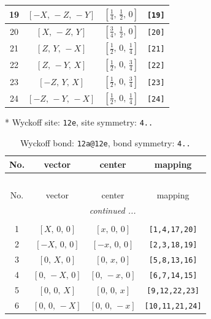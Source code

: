 \documentclass[fleqn,8pt]{jsarticle}
\begin{document}
\begin{longtable}{cccc}
19 & $\left[ - X,\, - Z,\, - Y \right]$ & $\left[ \frac{1}{4},\, \frac{1}{2},\, 0 \right]$ & {\tt [19]} \\ \hline
20 & $\left[ X,\, - Z,\, Y \right]$ & $\left[ \frac{3}{4},\, \frac{1}{2},\, 0 \right]$ & {\tt [20]} \\ \hline
21 & $\left[ Z,\, Y,\, - X \right]$ & $\left[ \frac{1}{2},\, 0,\, \frac{1}{4} \right]$ & {\tt [21]} \\ \hline
22 & $\left[ Z,\, - Y,\, X \right]$ & $\left[ \frac{1}{2},\, 0,\, \frac{3}{4} \right]$ & {\tt [22]} \\ \hline
23 & $\left[ - Z,\, Y,\, X \right]$ & $\left[ \frac{1}{2},\, 0,\, \frac{3}{4} \right]$ & {\tt [23]} \\ \hline
24 & $\left[ - Z,\, - Y,\, - X \right]$ & $\left[ \frac{1}{2},\, 0,\, \frac{1}{4} \right]$ & {\tt [24]} \\
\end{longtable}
* Wyckoff site: {\tt 12e}, site symmetry: {\tt 4..}
\renewcommand{\arraystretch}{1.2}
\begin{longtable}{cccc}
\caption{Wyckoff bond: {\tt 12a@12e}, bond symmetry: {\tt 4..}}
 \\
 \hline \hline
No. & vector & center & mapping \\ \hline \endfirsthead

\multicolumn{3}{l}{\tablename\ \thetable{}} \\
 \hline \hline
No. & vector & center & mapping \\ \hline \endhead

 \hline \hline
\multicolumn{3}{r}{\footnotesize\it continued ...} \\ \endfoot

 \hline \hline
\multicolumn{3}{r}{} \\ \endlastfoot

1 & $\left[ X,\, 0,\, 0 \right]$ & $\left[ x,\, 0,\, 0 \right]$ & {\tt [1,4,17,20]} \\ \hline
2 & $\left[ - X,\, 0,\, 0 \right]$ & $\left[ - x,\, 0,\, 0 \right]$ & {\tt [2,3,18,19]} \\ \hline
3 & $\left[ 0,\, X,\, 0 \right]$ & $\left[ 0,\, x,\, 0 \right]$ & {\tt [5,8,13,16]} \\ \hline
4 & $\left[ 0,\, - X,\, 0 \right]$ & $\left[ 0,\, - x,\, 0 \right]$ & {\tt [6,7,14,15]} \\ \hline
5 & $\left[ 0,\, 0,\, X \right]$ & $\left[ 0,\, 0,\, x \right]$ & {\tt [9,12,22,23]} \\ \hline
6 & $\left[ 0,\, 0,\, - X \right]$ & $\left[ 0,\, 0,\, - x \right]$ & {\tt [10,11,21,24]} \\
\end{longtable}
\end{document}
